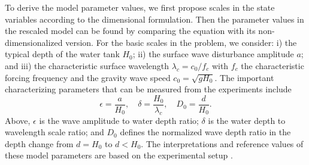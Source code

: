 \documentclass[9pt,twoside,lineno]{pnas-new}
\theoremstyle{plain}
\theoremstyle{plain}
\begin{document}
To derive the model parameter values, we first propose scales in the
state variables according to the dimensional formulation. Then the
parameter values in the rescaled model can be found by comparing the
equation with its non-dimensionalized version. For the basic scales
in the problem, we consider: i) the typical depth of the water tank
$H_{0}$; ii) the surface wave disturbance amplitude $a$; and iii)
the characteristic surface wavelength $\lambda_{c}=c_{0}/f_{c}$ with
$f_{c}$ the characteristic forcing frequency and the gravity wave
speed $c_{0}=\sqrt{gH_{0}}$. The important characterizing parameters
that can be measured from the experiments include 
\begin{equation}
\epsilon=\frac{a}{H_{0}},\quad\delta=\frac{H_{0}}{\lambda_{c}},\quad D_{0}=\frac{d}{H_{0}}.\label{eq:params}
\end{equation}
Above, $\epsilon$ is the wave amplitude to water depth ratio; $\delta$
is the water depth to wavelength scale ratio; and $D_{0}$ defines
the normalized wave depth ratio in the depth change from $d=H_{0}$
to $d<H_{0}$. The interpretations and reference values of these model
parameters are based on the experimental setup \cite{bolles2018anomalous}.
\end{document}
